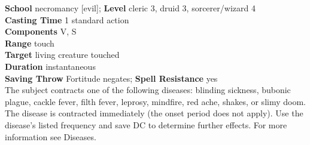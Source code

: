 \textbf{School} necromancy [evil]; \textbf{Level} cleric 3, druid 3, sorcerer/wizard 4\\
\textbf{Casting Time} 1 standard action\\
\textbf{Components} V, S\\
\textbf{Range} touch\\
\textbf{Target} living creature touched\\
\textbf{Duration} instantaneous\\
\textbf{Saving Throw} Fortitude negates; \textbf{Spell Resistance} yes\\
The subject contracts one of the following diseases: blinding sickness, bubonic plague, cackle fever, filth fever, leprosy, mindfire, red ache, shakes, or slimy doom. The disease is contracted immediately (the onset period does not apply). Use the disease's listed frequency and save DC to determine further effects. For more information see Diseases. \\
